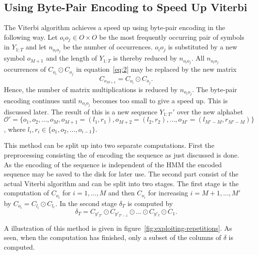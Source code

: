 \subsection{Using Byte-Pair Encoding to Speed Up Viterbi}
\label{sec:using-byte-pair}

The Viterbi algorithm achieves a speed up using byte-pair encoding in the
following way. Let $o_i o_j \in O \times O$ be the most frequently occurring
pair of symbols in $Y_{1:T}$ and let $n_{o_i o_j}$ be the number of
occurrences. $o_i o_j$ is substituted by a new symbol $o_{M + 1}$ and the length
of $Y_{1:T}$ is thereby reduced by $n_{o_i o_j}$. All $n_{o_i o_j}$ occurrences
of $C_{o_i} \odot C_{o_j}$ in equation~\eqref{eq:2} may be replaced by the new
matrix
\begin{equation}
  \label{eq:7}
  C_{o_{M + 1}} = C_{o_i} \odot C_{o_j}.
\end{equation}
Hence, the number of matrix multiplications is reduced by $n_{o_i o_j}$. The
byte-pair encoding continues until $n_{o_i o_j}$ becomes too small to give a
speed up. This is discussed later. The result of this is a new sequence
$Y_{1:T'}'$ over the new alphabet
$\mathcal{O}' = \{o_1, o_2, \dots, o_M, o_{M + 1} = (l_1, r_1), o_{M + 2} =
(l_2, r_2), \dots, o_{M'} = (l_{M' - M}, r_{M' - M}) \}$,
where $l_i, r_i \in \{ o_1, o_2, \dots, o_{i - 1} \}$.

This method can be split up into two separate computations. First the
preprocessing consisting the of encoding the sequence as just discussed is
done. As the encoding of the sequence is independent of the HMM the encoded
sequence may be saved to the disk for later use. The second part consist of the
actual Viterbi algorithm and can be split into two stages. The first stage is
the computation of $C_{o_i}$ for $i = 1, \dots, M$ and then $C_{o_i}$ for
increasing $i = M + 1, \dots, M'$ by $C_{o_i} = C_{l_i} \odot C_{l_r}$. In the
second stage $\delta_T$ is computed by
\begin{equation}
  \label{eq:3}
  \delta_T = C_{y'_{T'}} \odot C_{y'_{T'-1}} \odot \dots \odot C_{y'_2} \odot C_1.
\end{equation}

A illustration of this method is given in
figure~\ref{fig:exploiting-repetitions}. As seen, when the computation has
finished, only a subset of the columns of $\delta$ is computed.

